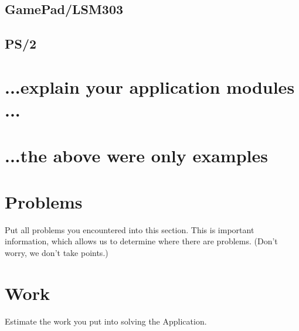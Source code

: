 \documentclass[12pt,a4paper,titlepage,oneside]{article}
\begin{document}
\subsection{GamePad/LSM303}

\subsection{PS/2}


\section{...explain your application modules ...}

\section{...the above were only examples}


\section{Problems}

Put all problems you encountered into this section.
This is important information, which allows us to determine where there are
problems.
(Don't worry, we don't take points.)


\section{Work}

Estimate the work you put into solving the Application.
\end{document}
